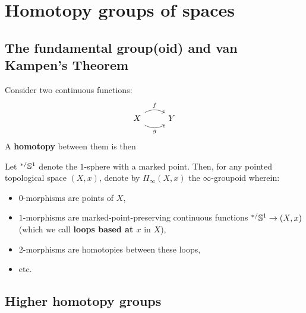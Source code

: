 \section{Homotopy groups of spaces}
    \subsection{The fundamental group(oid) and van Kampen's Theorem}
        \begin{definition}[Homotopies] \label{def: homotopies}
            Consider two continuous functions:
                $$
                    \begin{tikzcd}
                        X \arrow[r, "g"', bend right, shift right] \arrow[r, "f", bend left, shift left] & Y
                    \end{tikzcd}
                $$
            A \textbf{homotopy} between them is then  
        \end{definition}
    
        \begin{definition} \label{def: the_fundamental_groupoid}
            Let ${}^{*/}\mathbb{S}^1$ denote the $1$-sphere with a marked point. Then, for any pointed topological space $(X, x)$, denote by $\Pi_{\infty}(X, x)$ the $\infty$-groupoid wherein:
                \begin{itemize}
                    \item $0$-morphisms are points of $X$,
                    \item $1$-morphisms are marked-point-preserving continuous functions ${}^{*/}\mathbb{S}^1 \to (X, x)$ (which we call \textbf{loops based at $x$} in $X$),
                    \item $2$-morphisms are homotopies between these loops,
                    \item etc.
                \end{itemize}
        \end{definition}
    
    \subsection{Higher homotopy groups}
